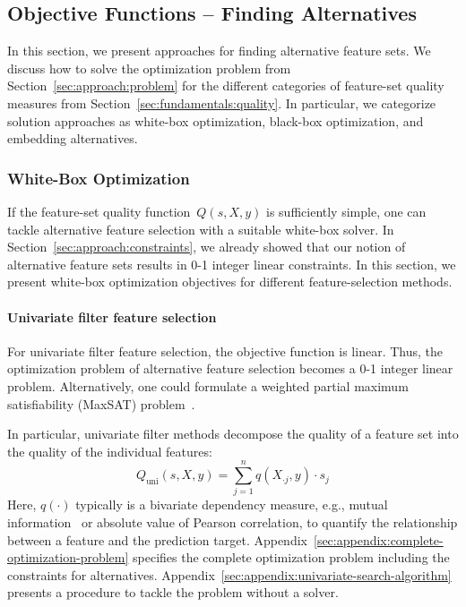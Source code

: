 \documentclass{article}
\theoremstyle{definition}
\begin{document}
\subsection{Objective Functions -- Finding Alternatives}
\label{sec:approach:objectives}

In this section, we present approaches for finding alternative feature sets.
We discuss how to solve the optimization problem from Section~\ref{sec:approach:problem} for the different categories of feature-set quality measures from Section~\ref{sec:fundamentals:quality}.
In particular, we categorize solution approaches as white-box optimization, black-box optimization, and embedding alternatives.

\subsubsection{White-Box Optimization}
\label{sec:approach:objectives:white-box}

If the feature-set quality function~$Q(s,X,y)$ is sufficiently simple, one can tackle alternative feature selection with a suitable white-box solver.
In Section~\ref{sec:approach:constraints}, we already showed that our notion of alternative feature sets results in 0-1 integer linear constraints.
In this section, we present white-box optimization objectives for different feature-selection methods.

\paragraph{Univariate filter feature selection}

For univariate filter feature selection, the objective function is linear.
Thus, the optimization problem of alternative feature selection becomes a 0-1 integer linear problem.
Alternatively, one could formulate a weighted partial maximum satisfiability (MaxSAT) problem~\cite{li2021maxsat}.

In particular, univariate filter methods decompose the quality of a feature set into the quality of the individual features:
%
\begin{equation}
	Q_{\text{uni}}(s,X,y) = \sum_{j=1}^{n} q(X_{\cdot{}j},y) \cdot s_j
	\label{eq:univariate-filter}
\end{equation}
%
Here, $q(\cdot)$ typically is a bivariate dependency measure, e.g., mutual information~\cite{kraskov2004estimating} or absolute value of Pearson correlation, to quantify the relationship between a feature and the prediction target.
Appendix~\ref{sec:appendix:complete-optimization-problem} specifies the complete optimization problem including the constraints for alternatives.
Appendix~\ref{sec:appendix:univariate-search-algorithm} presents a procedure to tackle the problem without a solver.
\end{document}
